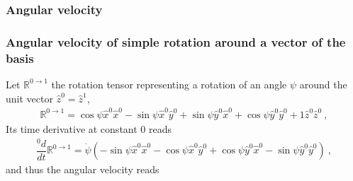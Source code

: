 \documentclass[letterpaper,10pt,english]{jupyterBook}
\begin{document}
\subsubsection{Angular velocity}
\label{\detokenize{ch/kinematics-rotations-param-euler:angular-velocity}}\label{\detokenize{ch/kinematics-rotations-param-euler:classical-mechanics-kinematics-rotations-euler-angular-velocity}}\subsubsection*{Angular velocity of simple rotation around a vector of the basis}

\sphinxAtStartPar
Let \(\mathbb{R}^{0\rightarrow 1}\) the rotation tensor representing a rotation of an angle \(\psi\) around the unit vector \(\hat{z}^0 = \hat{z}^1\),
\begin{equation*}
\begin{split}\mathbb{R}^{0\rightarrow 1} = \cos \psi \hat{x}^0 \hat{x}^0 - \sin \psi \hat{x}^0 \hat{y}^0 + \sin \psi\hat{y}^0 \hat{x}^0 + \cos \psi \hat{y}^0 \hat{y}^0 + 1 \hat{z}^0 \hat{z}^0 \ ,\end{split}
\end{equation*}
\sphinxAtStartPar
Its time derivative at constant \(0\) reads
\begin{equation*}
\begin{split}\dfrac{{}^0 d}{dt} \mathbb{R}^{0\rightarrow 1} = \dot{\psi} \left( -\sin \psi \hat{x}^0 \hat{x}^0 - \cos \psi \hat{x}^0 \hat{y}^0 + \cos \psi\hat{y}^0 \hat{x}^0 - \sin \psi \hat{y}^0 \hat{y}^0 \right ) \ ,\end{split}
\end{equation*}
\sphinxAtStartPar
and thus the angular velocity reads
\end{document}
